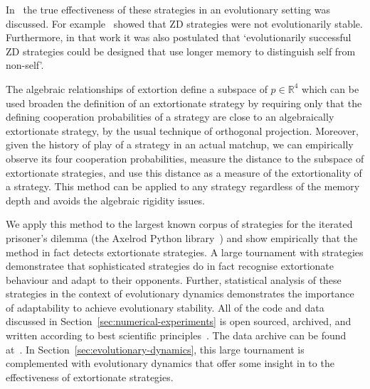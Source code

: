 \documentclass[a4paper]{article}
\begin{document}
In~\cite{adami2013evolutionary, Hilbe2013, hilbe2013adaptive, hilbe2015partners,
ichinose2018zero, Moran1707} the true effectiveness of these strategies in an
evolutionary setting was discussed. For
example~\cite{adami2013evolutionary} showed that ZD strategies were not
evolutionarily stable. Furthermore, in that work it was also postulated that
`evolutionarily successful ZD strategies could be designed that use longer memory
to distinguish self from non-self'.

The algebraic relationships of extortion define a subspace of
\(p\in\mathbb{R}^4\) which can be used broaden the definition of an extortionate
strategy by requiring only that the defining cooperation probabilities of a
strategy are close to an algebraically extortionate strategy, by the usual
technique of orthogonal projection. Moreover, given the history of play of a
strategy in an actual matchup, we can empirically observe its four
cooperation probabilities, measure the distance to the subspace of extortionate
strategies, and use this distance as a measure of the extortionality of a
strategy. This method can be applied to any strategy regardless of the memory
depth and avoids the algebraic rigidity issues.

We apply this method to the largest known corpus of strategies for the iterated
prisoner's dilemma (the Axelrod Python library~\cite{Knight2016, Knight2018})
and show empirically that the method in fact detects extortionate strategies.
A large tournament with 
strategies demonstratee that sophisticated
strategies do in fact recognise extortionate behaviour and adapt to their
opponents. Further, statistical analysis of these strategies in the context of
evolutionary dynamics demonstrates the importance of adaptability to achieve
evolutionary stability. All of the code and data discussed in
Section~\ref{sec:numerical-experiments} is open sourced, archived, and written
according to best scientific principles~\cite{Wilson2014}. The data archive can
be found at~\cite{vincent_knight_2018_1297075}. In
Section~\ref{sec:evolutionary-dynamics}, this large tournament is complemented
with evolutionary dynamics that offer some insight in to the
effectiveness of extortionate strategies.
\end{document}

